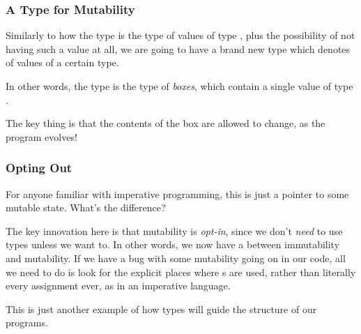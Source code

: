 \documentclass[aspectratio=169]{beamer}
\begin{document}

\begin{frame}[fragile]
  \frametitle{A Type for Mutability}

  Similarly to how the type  is the type of values of type ,
  plus the possibility of not having such a value at all, we are going to have a
  brand new type which denotes  of values of a certain type.

  \pause
  \vspace{\fill}


  \pause
  \vspace{\fill}

  In other words, the type  is the type of \textit{boxes}, which contain
  a single value of type .

  \vspace{\fill}

  \begin{center}
  \end{center}

  \pause
  \vspace{\fill}

  The key thing is that the contents of the box are allowed to change, as the
  program evolves!
\end{frame}

\begin{frame}[fragile]
  \frametitle{Opting Out}

  \tgs

  For anyone familiar with imperative programming, this is just a pointer to
  some mutable state. What's the difference?

  \pause
  \vspace{\fill}

  The key innovation here is that mutability is \textit{opt-in}, since we don't
  \textit{need} to use  types unless we want to. In other words, we now
  have a  between immutability and mutability. If we
  have a bug with some mutability going on in our code, all we need to do is look
  for the explicit places where s are used, rather than literally every
  assignment ever, as in an imperative language.

  \pause
  \vspace{\fill}

  This is just another example of how types will guide the structure of our programs.
\end{frame}
\end{document}
